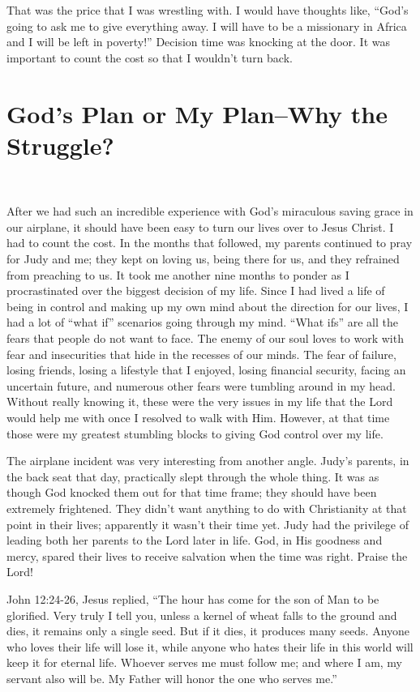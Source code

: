 \documentclass[oneside]{book}
\begin{document}
That was the price that I was wrestling with. I would have thoughts like, “God's going to ask me to give everything away. I will have to be a missionary in Africa and I will be left in poverty!” Decision time was knocking at the door. It was important to count the cost so that I wouldn't turn back.


\chapter{God's Plan or My Plan--Why the Struggle?}
\

After we had such an incredible experience with God's miraculous saving grace in our airplane, it should have been easy to turn our lives over to Jesus Christ. I had to count the cost. In the months that followed, my parents continued to pray for Judy and me; they kept on loving us, being there for us, and they refrained from preaching to us. It took me another nine months to ponder as I procrastinated over the biggest decision of my life. Since I had lived a life of being in control and making up my own mind about the direction for our lives, I had a lot of “what if” scenarios going through my mind. “What ifs” are all the fears that people do not want to face. The enemy of our soul loves to work with fear and insecurities that hide in the recesses of our minds. The fear of failure, losing friends, losing a lifestyle that I enjoyed, losing financial security, facing an uncertain future, and numerous other fears were tumbling around in my head. Without really knowing it, these were the very issues in my life that the Lord would help me with once I resolved to walk with Him. However, at that time those were my greatest stumbling blocks to giving God control over my life. 

The airplane incident was very interesting from another angle. Judy's parents, in the back seat that day, practically slept through the whole thing. It was as though God knocked them out for that time frame; they should have been extremely frightened. They didn't want anything to do with Christianity at that point in their lives; apparently it wasn’t their time yet. Judy had the privilege of leading both her parents to the Lord later in life. God, in His goodness and mercy, spared their lives to receive salvation when the time was right. Praise the Lord!

John 12:24-26, Jesus replied, “The hour has come for the son of Man to be glorified. Very truly I tell you, unless a kernel of wheat falls to the ground and dies, it remains only a single seed. But if it dies, it produces many seeds. Anyone who loves their life will lose it, while anyone who hates their life in this world will keep it for eternal life. Whoever serves me must follow me; and  where I am, my servant also will be. My Father will honor the one who serves me.”
\end{document}
